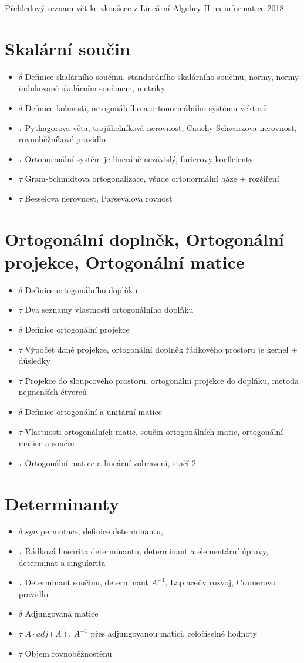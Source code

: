 \documentclass[a4paper]{article}
\begin{document}
\renewcommand{\headrulewidth}{0pt} %
\thispagestyle{fancy} %
Přehledový seznam vět ke zkoušece z Lineární Algebry II na informatice 2018

\newcommand{\itemv}{\item $\tau$ \hspace{0.2cm}}
\newcommand{\itemd}{\item $\delta$ \hspace{0.2cm}}
\section{Skalární součin}
\begin{itemize}
    \itemd Definice skalárního součinu, standardního skalárního součinu, normy, normy indukované skalárním součinem, metriky
    \itemd Definice kolmosti, ortogonálního a ortonormálního systému vektorů
    \itemv Pythagorova věta, trojúhelníková nerovnost, Cauchy Schwarzova nerovnost, rovnoběžníkové pravidlo
    \itemv Ortonormální systém je lineráně nezávislý, furierovy koeficienty
    \itemv Gram-Schmidtova ortogonalizace, všude ortonormální báze + rozšíření
    \itemv Besselova nerovnost, Parsevalova rovnost
\end{itemize}

\section{Ortogonální doplněk, Ortogonální projekce, Ortogonální matice}
\begin{itemize}
    \itemd Definice ortogonálního doplňku
    \itemv Dva seznamy vlastností ortogonálního doplňku
    \itemd Definice ortogonální projekce
    \itemv Výpočet dané projekce, ortogonální doplněk řádkového prostoru je kernel + důsledky
    \itemv Projekce do sloupcového prostoru, ortogonální projekce do doplňku, metoda nejmenších čtverců
    \itemd Definice ortogonální a unitární matice
    \itemv Vlastnosti ortogonálních matic, součin ortogonálních matic, ortogonální matice a součin
    \itemv Ortogonální matice a lineární zobrazení, stačí 2
\end{itemize}

\section{Determinanty}
\begin{itemize}
    \itemd $sgn$ permutace, definice determinantu, 
    \itemv Řádková linearita determinantu, determinant a elementární úpravy, determinat a singularita
    \itemv Determinant součinu, determinant $A^{-1}$, Laplaceův rozvoj, Cramerovo pravidlo
    \itemd Adjungovaná matice
    \itemv $A\cdot adj(A)$, $A^{-1}$ přes adjungovanou matici, celočíselné hodnoty
    \itemv Objem rovnoběžnostěnu
\end{itemize}
\end{document}
